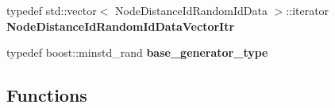 \begin{DoxyCompactItemize}
\item 
\hypertarget{namespaceall__distance__sketch_ab3b8677a1a08a8cd393e4dc0cc0f90e2}{}typedef std\+::vector$<$ Node\+Distance\+Id\+Random\+Id\+Data $>$\+::iterator {\bfseries Node\+Distance\+Id\+Random\+Id\+Data\+Vector\+Itr}\label{namespaceall__distance__sketch_ab3b8677a1a08a8cd393e4dc0cc0f90e2}

\item 
\hypertarget{namespaceall__distance__sketch_afd0190bdb1b259b86910f87a565d592d}{}typedef boost\+::minstd\+\_\+rand {\bfseries base\+\_\+generator\+\_\+type}\label{namespaceall__distance__sketch_afd0190bdb1b259b86910f87a565d592d}

\end{DoxyCompactItemize}
\subsection*{Functions}
